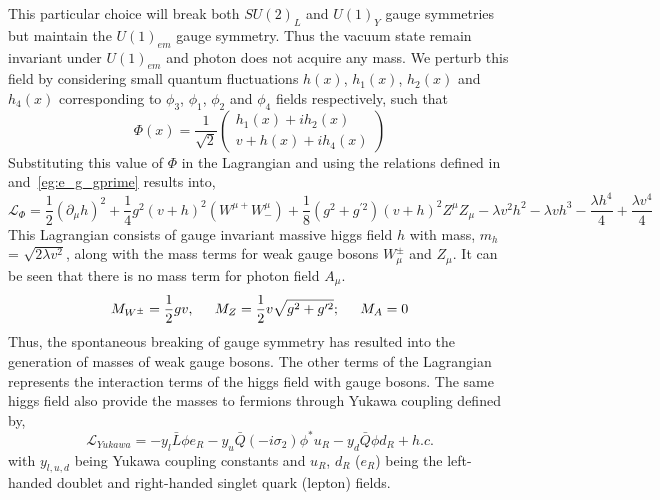 \noindent This particular choice will break both $SU(2)_{L}$ and $U(1)_{Y}$ gauge symmetries but maintain the $U(1)_{em}$ gauge symmetry. Thus the vacuum state remain invariant
under $U(1)_{em}$ and photon does not acquire any mass. We perturb this field by considering small quantum fluctuations $h(x)$, $h_{1}(x)$, $h_{2}(x)$ and $h_{4}(x)$
corresponding to $\phi_{3}$, $\phi_{1}$, $\phi_{2}$ and $\phi_{4}$ fields respectively, such that
\begin{equation}
  \Phi(x) = \frac{1}{\sqrt{2}} \left(\begin{array}{c} h_{1}(x) + i h_{2}(x) \\ v + h(x) + i h_{4}(x) \end{array}\right)
  \label{eq:Higgs_phi_final}
\end{equation}
Substituting this value of $\Phi$ in the Lagrangian and using the relations defined in \eqns{\ref{eq:EWK_Zmu_Amu},~\ref{eg:theta_w}} and~\ref{eg:e_g_gprime} results into,
\begin{equation}
  \mathcal{L}_{\Phi} = \frac{1}{2}(\partial_{\mu}h)^{2}  + \frac{1}{4}g^{2}(v+h)^{2}(W^{{\mu}+}W_{-}^{\mu}) + \frac{1}{8}(g^{2} + g^{{\prime}2})(v+h)^{2}Z^{\mu}Z_{\mu}
                       - {\lambda}v^{2}h^{2} - {\lambda}vh^{3} - \frac{{\lambda}h^{4}}{4} + \frac{{\lambda}v^{4}}{4}
\end{equation}
This Lagrangian consists of gauge invariant massive higgs field $h$ with mass, $m_{h}$ = $\sqrt{2{\lambda}v^{2}}$, along with the mass terms
for weak gauge bosons $W_{\mu}^{\pm}$ and $Z_{\mu}$. It can be seen that there is no mass term for photon field $A_{\mu}$.
\begin{equation}
  M_{W^{\pm}} = \frac{1}{2}gv, \hspace{0.2in} M_{Z} = \frac{1}{2}v{\sqrt{g^{2} + g^{{\prime}2}}}; \hspace{0.2in} M_{A} = 0 
\end{equation}
Thus, the spontaneous breaking of gauge symmetry has resulted into the generation of masses of weak gauge bosons. The other terms of the Lagrangian represents
the interaction terms of the higgs field with gauge bosons. The same higgs field also provide the masses to fermions through Yukawa coupling defined by,
\clearpage
\begin{equation}
  \mathcal{L}_{Yukawa} = -y_{l}\bar{L}{\phi}e_{R} -y_{u}\bar{Q}(-i{\sigma}_{2}){\phi}^{\ast}u_{R} -y_{d}\bar{Q}{\phi}d_{R} + h.c.
  \label{eq:Yukawa_coup}
\end{equation}
with $y_{l,u,d}$ being Yukawa coupling constants and ${u}_{R}$, ${d}_{R}$ (${e}_{R}$) being the left-handed doublet and right-handed singlet quark (lepton) fields.
